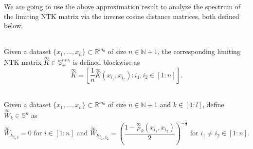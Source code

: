 \documentclass[twoside,11pt]{article}
\newcommand{\R}{\mathbb{R}}
\newcommand{\N}{\mathbb{N}}
\newcommand{\limiting}[1]{\overset{\scriptscriptstyle\infty}{#1}}
\begin{document}
We are going to use the above approximation result to analyze the spectrum of the limiting NTK matrix via the inverse cosine distance matrices, both defined below.

\begin{definition}~\\
Given a dataset $\{x_1,\ldots,x_n\} \subset \R^{m_0}$ of size $n \in \N+1$, the corresponding limiting NTK matrix $\limiting{K} \in \mathbb{S}^{n m_l}_+$ is defined blockwise as 
\[
\limiting{K} = \left[ \frac{1}{n} \limiting{K}(x_{i_1},x_{i_2}) : i_1,i_2 \in [1:n] \right].
\]
\end{definition}

\begin{definition}~\\
Given a dataset $\{x_1,\ldots,x_n\} \subset \R^{m_0}$ of size $n \in \N+1$ and $k \in [1:l]$, define $\limiting{W}_k \in \mathbb{S}^n$ as
\[
{\limiting{W}_k}_{i,i} = 0 \text{ for } i \in [1:n] \text{ and } {\limiting{W}_k}_{i_1,i_2} = \left( \frac{1 - \limiting{\rho}_k(x_{i_1},x_{i_2})}{2} \right)^{-\frac{1}{2}} \text{ for } i_1 \neq i_2 \in [1:n].
\]
\end{definition}
\end{document}

